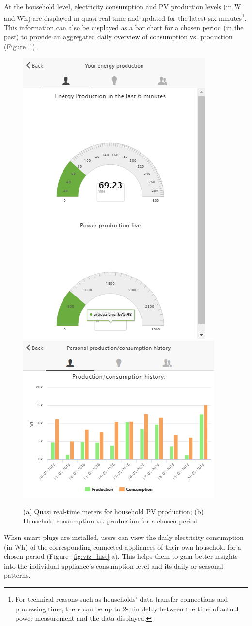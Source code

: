 At the household level, electricity consumption and PV production levels (in W and Wh) are displayed in quasi real-time and updated for the latest six minutes\footnote{For technical reasons such as households' data transfer connections and processing time, there can be up to 2-min delay between the time of actual power measurement and the data displayed.}.
This information can also be displayed as a bar chart for a chosen period (in the past) to provide an aggregated daily overview of consumption vs. production (Figure~\ref{fig:viz_rt}). 
% 
\begin{figure}[b]
\sidecaption[t]
        \includegraphics[width=.25\linewidth]{img/visual_production.png}	        \includegraphics[width=.35\linewidth]{img/historicalcomparison_prodcons.png} 
    \caption{(a) Quasi real-time meters for household PV production; (b) Household consumption vs. production for a chosen period}
\label{fig:viz_rt}
\end{figure}
%
When smart plugs are installed, users can view the daily electricity consumption (in Wh) of the corresponding connected appliances of their own household for a chosen period (Figure~\ref{fig:viz_hist} a). This helps them to gain better insights into the individual appliance's consumption level and its daily or seasonal patterns. 
